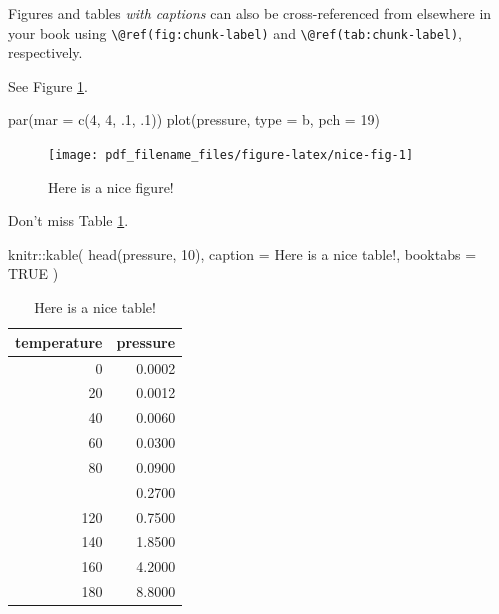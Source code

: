 \documentclass[
]{book}
\newenvironment{Shaded}{\begin{snugshade}}{\end{snugshade}}
\newcommand{\AttributeTok}[1]{\textcolor[rgb]{0.77,0.63,0.00}{#1}}
\newcommand{\ConstantTok}[1]{\textcolor[rgb]{0.00,0.00,0.00}{#1}}
\newcommand{\DecValTok}[1]{\textcolor[rgb]{0.00,0.00,0.81}{#1}}
\newcommand{\FunctionTok}[1]{\textcolor[rgb]{0.00,0.00,0.00}{#1}}
\newcommand{\NormalTok}[1]{#1}
\newcommand{\SpecialCharTok}[1]{\textcolor[rgb]{0.00,0.00,0.00}{#1}}
\newcommand{\StringTok}[1]{\textcolor[rgb]{0.31,0.60,0.02}{#1}}
\theoremstyle{definition}
\theoremstyle{definition}
\theoremstyle{definition}
\theoremstyle{definition}
\theoremstyle{remark}
\begin{document}
Figures and tables \emph{with captions} can also be cross-referenced from elsewhere in your book using \texttt{\textbackslash{}@ref(fig:chunk-label)} and \texttt{\textbackslash{}@ref(tab:chunk-label)}, respectively.

See Figure \ref{fig:nice-fig}.

\begin{Shaded}
\begin{Highlighting}[]
\FunctionTok{par}\NormalTok{(}\AttributeTok{mar =} \FunctionTok{c}\NormalTok{(}\DecValTok{4}\NormalTok{, }\DecValTok{4}\NormalTok{, .}\DecValTok{1}\NormalTok{, .}\DecValTok{1}\NormalTok{))}
\FunctionTok{plot}\NormalTok{(pressure, }\AttributeTok{type =} \StringTok{\textquotesingle{}b\textquotesingle{}}\NormalTok{, }\AttributeTok{pch =} \DecValTok{19}\NormalTok{)}
\end{Highlighting}
\end{Shaded}

\begin{figure}

{\centering \texttt{[image: pdf\_filename\_files/figure-latex/nice-fig-1]} 

}

\caption{Here is a nice figure!}\label{fig:nice-fig}
\end{figure}

Don't miss Table \ref{tab:nice-tab}.

\begin{Shaded}
\begin{Highlighting}[]
\NormalTok{knitr}\SpecialCharTok{::}\FunctionTok{kable}\NormalTok{(}
  \FunctionTok{head}\NormalTok{(pressure, }\DecValTok{10}\NormalTok{), }\AttributeTok{caption =} \StringTok{\textquotesingle{}Here is a nice table!\textquotesingle{}}\NormalTok{,}
  \AttributeTok{booktabs =} \ConstantTok{TRUE}
\NormalTok{)}
\end{Highlighting}
\end{Shaded}

\begin{table}

\caption{\label{tab:nice-tab}Here is a nice table!}
\centering
\begin{tabular}[t]{rr}
\toprule
temperature & pressure\\
\midrule
0 & 0.0002\\
20 & 0.0012\\
40 & 0.0060\\
60 & 0.0300\\
80 & 0.0900\\
\addlinespace
100 & 0.2700\\
120 & 0.7500\\
140 & 1.8500\\
160 & 4.2000\\
180 & 8.8000\\
\bottomrule
\end{tabular}
\end{table}
\end{document}
